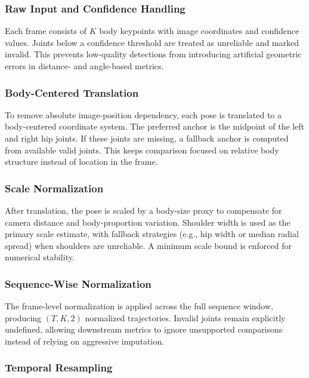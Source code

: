 \documentclass[12pt]{article}
\begin{document}
{\subsubsection{Raw Input and Confidence Handling}

Each frame consists of \(K\) body keypoints with image coordinates and confidence values. Joints below a confidence threshold are treated as unreliable and marked invalid. This prevents low-quality detections from introducing artificial geometric errors in distance- and angle-based metrics.

\subsubsection{Body-Centered Translation}

To remove absolute image-position dependency, each pose is translated to a body-centered coordinate system. The preferred anchor is the midpoint of the left and right hip joints. If these joints are missing, a fallback anchor is computed from available valid joints. This keeps comparison focused on relative body structure instead of location in the frame.

\subsubsection{Scale Normalization}

After translation, the pose is scaled by a body-size proxy to compensate for camera distance and body-proportion variation. Shoulder width is used as the primary scale estimate, with fallback strategies (e.g., hip width or median radial spread) when shoulders are unreliable. A minimum scale bound is enforced for numerical stability.

\subsubsection{Sequence-Wise Normalization}

The frame-level normalization is applied across the full sequence window, producing \((T, K, 2)\) normalized trajectories. Invalid joints remain explicitly undefined, allowing downstream metrics to ignore unsupported comparisons instead of relying on aggressive imputation.

\subsubsection{Temporal Resampling}

}
\end{document}
